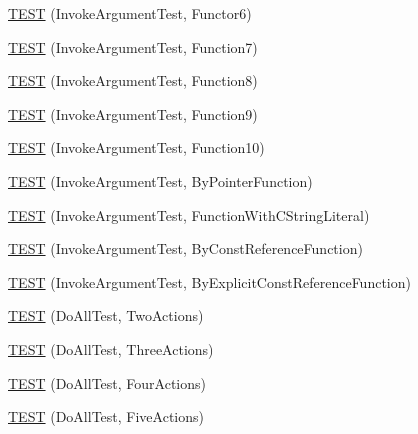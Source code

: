 \begin{DoxyCompactItemize}
\item 
\mbox{\hyperlink{namespacetesting_1_1gmock__generated__actions__test_a789c7e8ee88243dc4a53841f6a8da3c6}{T\+E\+ST}} (Invoke\+Argument\+Test, Functor6)
\item 
\mbox{\hyperlink{namespacetesting_1_1gmock__generated__actions__test_a3e13c2ccf384c80c66116418e1b3ccde}{T\+E\+ST}} (Invoke\+Argument\+Test, Function7)
\item 
\mbox{\hyperlink{namespacetesting_1_1gmock__generated__actions__test_a5d583a32b46a306139d32ea9a1d575a9}{T\+E\+ST}} (Invoke\+Argument\+Test, Function8)
\item 
\mbox{\hyperlink{namespacetesting_1_1gmock__generated__actions__test_a3a278f02e1633feda3dea30d810a49ea}{T\+E\+ST}} (Invoke\+Argument\+Test, Function9)
\item 
\mbox{\hyperlink{namespacetesting_1_1gmock__generated__actions__test_afe4653b181e199417b004c4485152010}{T\+E\+ST}} (Invoke\+Argument\+Test, Function10)
\item 
\mbox{\hyperlink{namespacetesting_1_1gmock__generated__actions__test_ac3ff9db96cb7a664ef44d20eb0a7a71f}{T\+E\+ST}} (Invoke\+Argument\+Test, By\+Pointer\+Function)
\item 
\mbox{\hyperlink{namespacetesting_1_1gmock__generated__actions__test_a698f1a80b7fed18141fd170524908885}{T\+E\+ST}} (Invoke\+Argument\+Test, Function\+With\+C\+String\+Literal)
\item 
\mbox{\hyperlink{namespacetesting_1_1gmock__generated__actions__test_a82aff636cad2f441c584fc8e3c057d56}{T\+E\+ST}} (Invoke\+Argument\+Test, By\+Const\+Reference\+Function)
\item 
\mbox{\hyperlink{namespacetesting_1_1gmock__generated__actions__test_accb544431629bfb38a618343daaa54c2}{T\+E\+ST}} (Invoke\+Argument\+Test, By\+Explicit\+Const\+Reference\+Function)
\item 
\mbox{\hyperlink{namespacetesting_1_1gmock__generated__actions__test_ab1820fa999561582ae20885c4149a634}{T\+E\+ST}} (Do\+All\+Test, Two\+Actions)
\item 
\mbox{\hyperlink{namespacetesting_1_1gmock__generated__actions__test_a9fe00b82e3daa39501cefb4636b1909c}{T\+E\+ST}} (Do\+All\+Test, Three\+Actions)
\item 
\mbox{\hyperlink{namespacetesting_1_1gmock__generated__actions__test_aa6ed664752eab81abc0c8ec08bc28fe0}{T\+E\+ST}} (Do\+All\+Test, Four\+Actions)
\item 
\mbox{\hyperlink{namespacetesting_1_1gmock__generated__actions__test_adf15fb74ccf2a473a31f0ae733210f3f}{T\+E\+ST}} (Do\+All\+Test, Five\+Actions)

\end{DoxyCompactItemize}
